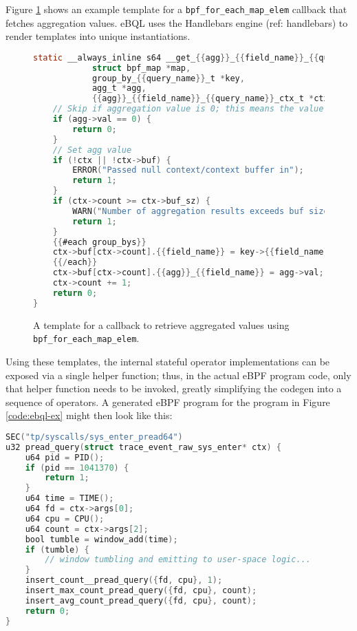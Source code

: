 Figure \ref{code:agg-tmpl} shows an example template for a \texttt{bpf\_for\_each\_map\_elem}
callback that fetches aggregation values. eBQL uses the Handlebars engine (ref: handlebars) to
render templates into unique instantiations.

\begin{figure}[htpb]
\begin{lstlisting}[language=C]
static __always_inline s64 __get_{{agg}}_{{field_name}}_{{query_name}}_callback(
            struct bpf_map *map,
            group_by_{{query_name}}_t *key,
            agg_t *agg,
            {{agg}}_{{field_name}}_{{query_name}}_ctx_t *ctx) {
    // Skip if aggregation value is 0; this means the value was cleared
    if (agg->val == 0) {
        return 0;
    }
    // Set agg value
    if (!ctx || !ctx->buf) {
        ERROR("Passed null context/context buffer in");
        return 1;
    }
    if (ctx->count >= ctx->buf_sz) {
        WARN("Number of aggregation results exceeds buf size; stopping...");
        return 1;
    }
    {{#each group_bys}}
    ctx->buf[ctx->count].{{field_name}} = key->{{field_name}};
    {{/each}}
    ctx->buf[ctx->count].{{agg}}_{{field_name}} = agg->val;
    ctx->count += 1;
    return 0;
}
\end{lstlisting}
\caption{A template for a callback to retrieve aggregated values using
\texttt{bpf\_for\_each\_map\_elem}.}
\label{code:agg-tmpl}
\end{figure}

Using these templates, the internal stateful operator implementations can be exposed via a single
helper function; thus, in the actual eBPF program code, only that helper function needs to be
invoked, greatly simplifying the codegen into a sequence of operators. A generated eBPF program for
the program in Figure \ref{code:ebql-ex} might then look like this:

\begin{lstlisting}[language=C]
SEC("tp/syscalls/sys_enter_pread64")
u32 pread_query(struct trace_event_raw_sys_enter* ctx) {
    u64 pid = PID();
    if (pid == 1041370) {
        return 1;
    }
    u64 time = TIME();
    u64 fd = ctx->args[0];
    u64 cpu = CPU();
    u64 count = ctx->args[2];
    bool tumble = window_add(time);
    if (tumble) {
        // window tumbling and emitting to user-space logic...
    }
    insert_count__pread_query({fd, cpu}, 1);
    insert_max_count_pread_query({fd, cpu}, count);
    insert_avg_count_pread_query({fd, cpu}, count);
    return 0;
}
\end{lstlisting}

